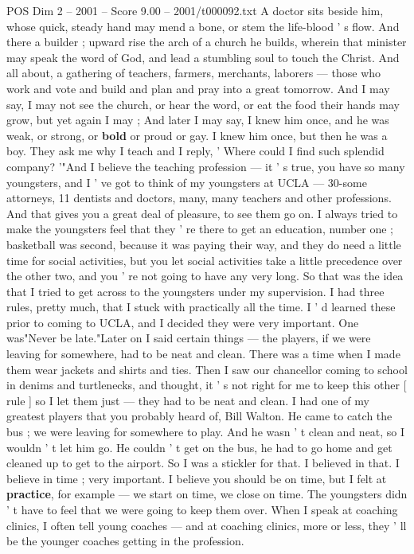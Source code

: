 \begin{textsample}{POS Dim 2 – 2001 – Score 9.00 – 2001/t000092.txt}
A doctor sits beside him, whose quick, steady hand may mend a bone, or stem the life-blood ' s flow.
And there a builder ; upward rise the arch of a church he builds, wherein that minister may speak the word of God, and lead a stumbling soul to touch the Christ.
And all about, a gathering of teachers, farmers, merchants, laborers — those who work and vote and build and plan and pray into a great tomorrow.
And I may say, I may not see the church, or hear the word, or eat the food their hands may grow, but yet again I may ; And later I may say, I knew him once, and he was weak, or strong, or \textbf{bold} or proud or gay.
I knew him once, but then he was a boy.
They ask me why I teach and I reply, ' Where could I find such splendid company? '"And I believe the teaching profession — it ' s true, you have so many youngsters, and I ' ve got to think of my youngsters at UCLA — 30-some attorneys, 11 dentists and doctors, many, many teachers and other professions.
And that gives you a great deal of pleasure, to see them go on.
I always tried to make the youngsters feel that they ' re there to get an education, number one ; basketball was second, because it was paying their way, and they do need a little time for social activities, but you let social activities take a little precedence over the other two, and you ' re not going to have any very long.
So that was the idea that I tried to get across to the youngsters under my supervision.
I had three rules, pretty much, that I stuck with practically all the time.
I ' d learned these prior to coming to UCLA, and I decided they were very important.
One was"Never be late."Later on I said certain things — the players, if we were leaving for somewhere, had to be neat and clean.
There was a time when I made them wear jackets and shirts and ties.
Then I saw our chancellor coming to school in denims and turtlenecks, and thought, it ' s not right for me to keep this other [ rule ] so I let them just — they had to be neat and clean.
I had one of my greatest players that you probably heard of, Bill Walton.
He came to catch the bus ; we were leaving for somewhere to play.
And he wasn ' t clean and neat, so I wouldn ' t let him go.
He couldn ' t get on the bus, he had to go home and get cleaned up to get to the airport.
So I was a stickler for that.
I believed in that.
I believe in time ; very important.
I believe you should be on time, but I felt at \textbf{practice}, for example — we start on time, we close on time.
The youngsters didn ' t have to feel that we were going to keep them over.
When I speak at coaching clinics, I often tell young coaches — and at coaching clinics, more or less, they ' ll be the younger coaches getting in the profession.

\end{textsample}
